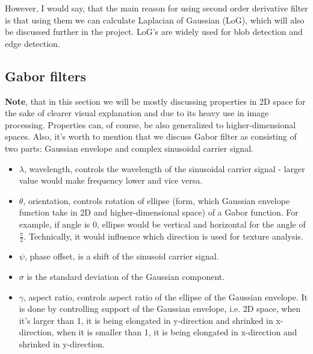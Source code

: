 \documentclass{article}
\begin{document}
However, I would say, that the main reason for using second order derivative filter is that using them we can calculate Laplacian of Gaussian (LoG), which will also be discussed further in the project. LoG's are widely used for blob detection and edge detection.

\subsection{Gabor filters}
\textbf{Note}, that in this section we will be mostly discussing properties in 2D space for the sake of clearer visual explanation and due to its heavy use in image processing. Properties can, of course, be also generalized to higher-dimensional spaces. Also, it's worth to mention that we discuss Gabor filter as consisting of two parts: Gaussian envelope and complex sinusoidal carrier signal.
\begin{itemize}
    \item $\lambda$, wavelength, controls the wavelength of the sinusoidal carrier signal - larger value would make frequency lower and vice versa.
    
    \item $\theta$, orientation, controls rotation of ellipse (form, which Gaussian envelope function take in 2D and higher-dimensional space) of a Gabor function. For example, if angle is 0, ellipse would be vertical and horizontal for the angle of $\frac{\pi}{2}$. Technically, it would influence which direction is used for texture analysis.
    
    \item $\psi$, phase offset, is a shift of the sinusoid carrier signal.
    
    \item $\sigma$ is the standard deviation of the Gaussian component.
    
    \item $\gamma$, aspect ratio, controls aspect ratio of the ellipse of the Gaussian envelope. It is done by controlling support of the Gaussian envelope, i.e. 2D space, when it's larger than 1, it is being elongated in y-direction and shrinked in x-direction, when it is smaller than 1, it is being elongated in x-direction and shrinked in y-direction.
     
\end{itemize}
\end{document}

